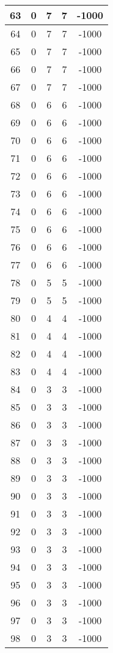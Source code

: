 \documentclass[letterpaper, 12pt]{article}
\begin{document}
\begin{longtable}{|c|c|c|c|c|}
\hline
63 & 0 & 7 & 7 & -1000 \\
\hline
64 & 0 & 7 & 7 & -1000 \\
\hline
65 & 0 & 7 & 7 & -1000 \\
\hline
66 & 0 & 7 & 7 & -1000 \\
\hline
67 & 0 & 7 & 7 & -1000 \\
\hline
68 & 0 & 6 & 6 & -1000 \\
\hline
69 & 0 & 6 & 6 & -1000 \\
\hline
70 & 0 & 6 & 6 & -1000 \\
\hline
71 & 0 & 6 & 6 & -1000 \\
\hline
72 & 0 & 6 & 6 & -1000 \\
\hline
73 & 0 & 6 & 6 & -1000 \\
\hline
74 & 0 & 6 & 6 & -1000 \\
\hline
75 & 0 & 6 & 6 & -1000 \\
\hline
76 & 0 & 6 & 6 & -1000 \\
\hline
77 & 0 & 6 & 6 & -1000 \\
\hline
78 & 0 & 5 & 5 & -1000 \\
\hline
79 & 0 & 5 & 5 & -1000 \\
\hline
80 & 0 & 4 & 4 & -1000 \\
\hline
81 & 0 & 4 & 4 & -1000 \\
\hline
82 & 0 & 4 & 4 & -1000 \\
\hline
83 & 0 & 4 & 4 & -1000 \\
\hline
84 & 0 & 3 & 3 & -1000 \\
\hline
85 & 0 & 3 & 3 & -1000 \\
\hline
86 & 0 & 3 & 3 & -1000 \\
\hline
87 & 0 & 3 & 3 & -1000 \\
\hline
88 & 0 & 3 & 3 & -1000 \\
\hline
89 & 0 & 3 & 3 & -1000 \\
\hline
90 & 0 & 3 & 3 & -1000 \\
\hline
91 & 0 & 3 & 3 & -1000 \\
\hline
92 & 0 & 3 & 3 & -1000 \\
\hline
93 & 0 & 3 & 3 & -1000 \\
\hline
94 & 0 & 3 & 3 & -1000 \\
\hline
95 & 0 & 3 & 3 & -1000 \\
\hline
96 & 0 & 3 & 3 & -1000 \\
\hline
97 & 0 & 3 & 3 & -1000 \\
\hline
98 & 0 & 3 & 3 & -1000 \\

\end{longtable}
\end{document}
